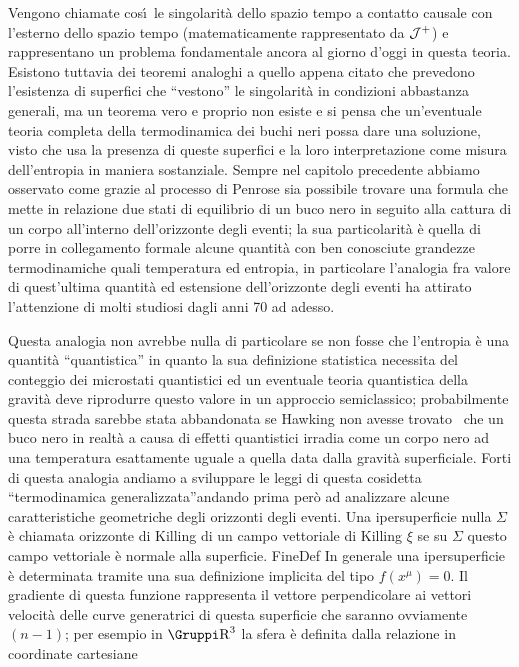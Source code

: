 Vengono chiamate cos\'\i\ le singolarit\`a dello spazio tempo a contatto causale con l'esterno dello spazio tempo (matematicamente rappresentato da ${\cal J}^+$) e rappresentano un problema fondamentale ancora al giorno d'oggi in questa teoria. Esistono tuttavia dei teoremi analoghi a quello appena citato che  prevedono l'esistenza di superfici che ``vestono'' le singolarit\`a in condizioni abbastanza generali, ma un teorema vero e proprio  non esiste e si pensa che un'eventuale teoria completa della termodinamica dei buchi neri possa dare una soluzione, visto che usa la presenza di queste superfici e la loro interpretazione come misura dell'entropia in maniera sostanziale.
%
%
%
Sempre nel capitolo precedente abbiamo osservato come grazie al processo di Penrose sia possibile trovare una formula che mette in relazione due stati di equilibrio di un buco nero in seguito alla cattura di un corpo all'interno dell'orizzonte degli eventi; la sua particolarit\`a  \`e quella di porre in collegamento formale alcune quantit\`a con ben conosciute grandezze termodinamiche quali temperatura ed entropia, in particolare l'analogia fra valore di quest'ultima quantit\`a  ed estensione dell'orizzonte degli eventi ha attirato l'attenzione di molti studiosi dagli anni 70 ad adesso.\par
Questa analogia non avrebbe nulla di particolare se non fosse che l'entropia \`e una quantit\`a ``quantistica'' in quanto la sua definizione statistica necessita del conteggio dei microstati quantistici ed un eventuale teoria quantistica della gravit\`a deve riprodurre questo valore in un approccio semiclassico; probabilmente questa strada sarebbe stata abbandonata se Hawking non avesse trovato \ che un buco nero in realt\`a a causa di effetti quantistici irradia come un corpo nero ad una temperatura esattamente uguale a quella data dalla gravit\`a superficiale. Forti di questa analogia andiamo a sviluppare le leggi di questa cosidetta ``termodinamica generalizzata''andando prima per\`o ad analizzare alcune caratteristiche geometriche degli orizzonti degli eventi.
Una ipersuperficie nulla $\Sigma$ \`e chiamata orizzonte di Killing di un campo vettoriale di Killing $\xi$ se su $\Sigma$ questo campo vettoriale \`e normale alla superficie.
FineDef	
In generale una ipersuperficie \`e determinata tramite una sua definizione implicita del tipo $f(x^\mu)=0$. Il gradiente di questa funzione rappresenta il vettore perpendicolare ai vettori velocit\`a delle curve generatrici di questa superficie che saranno ovviamente $(n-1)$; per esempio in $\RN{3}$ la sfera \`e definita dalla relazione in coordinate cartesiane

